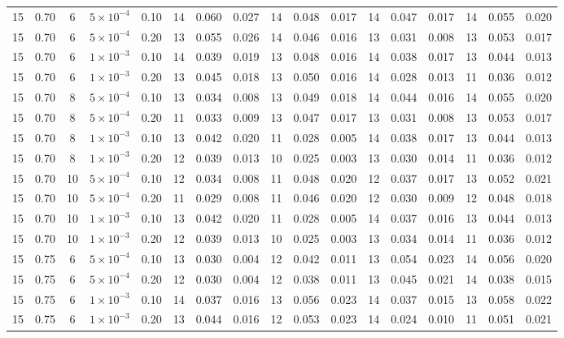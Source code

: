 \begin{longtable}{c c c c c c c c c c c c c c c c c }
15 & 0.70 & 6 & $5{\times}10^{-4}$ & 0.10 & 14 & 0.060 & 0.027 & 14 & 0.048 & 0.017 & 14 & 0.047 & 0.017 & 14 & 0.055 & 0.020 \\
15 & 0.70 & 6 & $5{\times}10^{-4}$ & 0.20 & 13 & 0.055 & 0.026 & 14 & 0.046 & 0.016 & 13 & 0.031 & 0.008 & 13 & 0.053 & 0.017 \\
15 & 0.70 & 6 & $1{\times}10^{-3}$ & 0.10 & 14 & 0.039 & 0.019 & 13 & 0.048 & 0.016 & 14 & 0.038 & 0.017 & 13 & 0.044 & 0.013 \\
15 & 0.70 & 6 & $1{\times}10^{-3}$ & 0.20 & 13 & 0.045 & 0.018 & 13 & 0.050 & 0.016 & 14 & 0.028 & 0.013 & 11 & 0.036 & 0.012 \\
15 & 0.70 & 8 & $5{\times}10^{-4}$ & 0.10 & 13 & 0.034 & 0.008 & 13 & 0.049 & 0.018 & 14 & 0.044 & 0.016 & 14 & 0.055 & 0.020 \\
15 & 0.70 & 8 & $5{\times}10^{-4}$ & 0.20 & 11 & 0.033 & 0.009 & 13 & 0.047 & 0.017 & 13 & 0.031 & 0.008 & 13 & 0.053 & 0.017 \\
15 & 0.70 & 8 & $1{\times}10^{-3}$ & 0.10 & 13 & 0.042 & 0.020 & 11 & 0.028 & 0.005 & 14 & 0.038 & 0.017 & 13 & 0.044 & 0.013 \\
15 & 0.70 & 8 & $1{\times}10^{-3}$ & 0.20 & 12 & 0.039 & 0.013 & 10 & 0.025 & 0.003 & 13 & 0.030 & 0.014 & 11 & 0.036 & 0.012 \\
15 & 0.70 & 10 & $5{\times}10^{-4}$ & 0.10 & 12 & 0.034 & 0.008 & 11 & 0.048 & 0.020 & 12 & 0.037 & 0.017 & 13 & 0.052 & 0.021 \\
15 & 0.70 & 10 & $5{\times}10^{-4}$ & 0.20 & 11 & 0.029 & 0.008 & 11 & 0.046 & 0.020 & 12 & 0.030 & 0.009 & 12 & 0.048 & 0.018 \\
15 & 0.70 & 10 & $1{\times}10^{-3}$ & 0.10 & 13 & 0.042 & 0.020 & 11 & 0.028 & 0.005 & 14 & 0.037 & 0.016 & 13 & 0.044 & 0.013 \\
15 & 0.70 & 10 & $1{\times}10^{-3}$ & 0.20 & 12 & 0.039 & 0.013 & 10 & 0.025 & 0.003 & 13 & 0.034 & 0.014 & 11 & 0.036 & 0.012 \\
15 & 0.75 & 6 & $5{\times}10^{-4}$ & 0.10 & 13 & 0.030 & 0.004 & 12 & 0.042 & 0.011 & 13 & 0.054 & 0.023 & 14 & 0.056 & 0.020 \\
15 & 0.75 & 6 & $5{\times}10^{-4}$ & 0.20 & 12 & 0.030 & 0.004 & 12 & 0.038 & 0.011 & 13 & 0.045 & 0.021 & 14 & 0.038 & 0.015 \\
15 & 0.75 & 6 & $1{\times}10^{-3}$ & 0.10 & 14 & 0.037 & 0.016 & 13 & 0.056 & 0.023 & 14 & 0.037 & 0.015 & 13 & 0.058 & 0.022 \\
15 & 0.75 & 6 & $1{\times}10^{-3}$ & 0.20 & 13 & 0.044 & 0.016 & 12 & 0.053 & 0.023 & 14 & 0.024 & 0.010 & 11 & 0.051 & 0.021 \\

\end{longtable}

